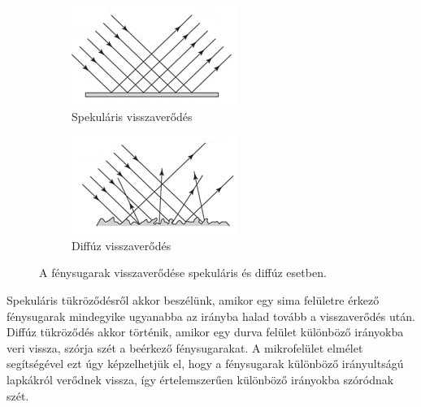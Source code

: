 \begin{figure}[!ht]
    \centering
    \begin{subfigure}[b]{0.4\textwidth}
        \centering
        \includegraphics[width=\textwidth]{images/specular_reflection.png}
        \caption{Spekuláris visszaverődés}
    \end{subfigure}
    \hfill
    \begin{subfigure}[b]{0.4\textwidth}
        \centering
        \includegraphics[width=\textwidth]{images/diffuse_reflection.png}
        \caption{Diffúz visszaverődés}
    \end{subfigure}

    \caption{A fénysugarak visszaverődése spekuláris és diffúz esetben.}
\end{figure}

Spekuláris tükröződésről akkor beszélünk, amikor egy sima felületre érkező fénysugarak mindegyike ugyanabba az irányba halad tovább a visszaverődés után. Diffúz tükröződés akkor történik, amikor egy durva felület különböző irányokba veri vissza, szórja szét a beérkező fénysugarakat. A mikrofelület elmélet segítségével ezt úgy képzelhetjük el, hogy a fénysugarak különböző irányultságú lapkákról verődnek vissza, így értelemszerűen különböző irányokba szóródnak szét.

